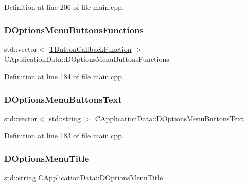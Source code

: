 Definition at line 206 of file main.\+cpp.

\hypertarget{classCApplicationData_a4c9516d20be17a9c9d5c1119736037e5}{}\label{classCApplicationData_a4c9516d20be17a9c9d5c1119736037e5} 
\subsubsection{\texorpdfstring{D\+Options\+Menu\+Buttons\+Functions}{DOptionsMenuButtonsFunctions}}
{\footnotesize\ttfamily std\+::vector$<$ \hyperlink{main_8cpp_af91bc223ea3fea871af009bfef33c595}{T\+Button\+Callback\+Function} $>$ C\+Application\+Data\+::\+D\+Options\+Menu\+Buttons\+Functions\hspace{0.3cm}{\ttfamily [protected]}}



Definition at line 184 of file main.\+cpp.

\hypertarget{classCApplicationData_aa9201da5408887973cb56fb1671ad6f8}{}\label{classCApplicationData_aa9201da5408887973cb56fb1671ad6f8} 
\subsubsection{\texorpdfstring{D\+Options\+Menu\+Buttons\+Text}{DOptionsMenuButtonsText}}
{\footnotesize\ttfamily std\+::vector$<$ std\+::string $>$ C\+Application\+Data\+::\+D\+Options\+Menu\+Buttons\+Text\hspace{0.3cm}{\ttfamily [protected]}}



Definition at line 183 of file main.\+cpp.

\hypertarget{classCApplicationData_a1e73e21e92eb68c1cfc0c4bcae8196df}{}\label{classCApplicationData_a1e73e21e92eb68c1cfc0c4bcae8196df} 
\subsubsection{\texorpdfstring{D\+Options\+Menu\+Title}{DOptionsMenuTitle}}
{\footnotesize\ttfamily std\+::string C\+Application\+Data\+::\+D\+Options\+Menu\+Title\hspace{0.3cm}{\ttfamily [protected]}}



